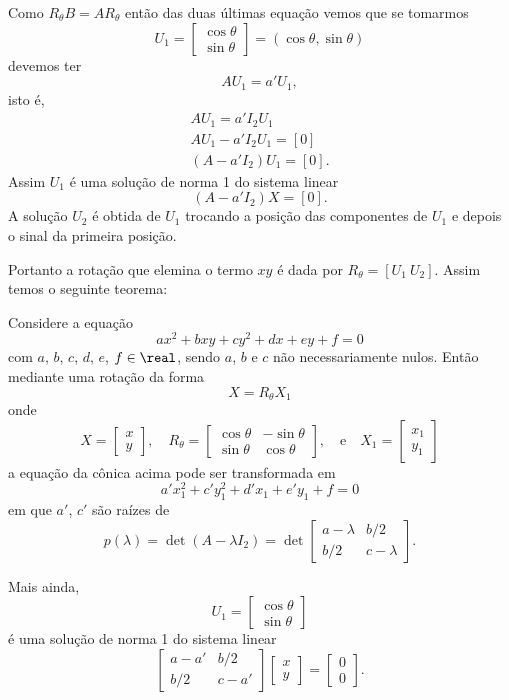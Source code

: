 Como $R_\theta B = AR_\theta$ então das duas \'ultimas equação vemos que se tomarmos
\[
  U_1 = \begin{bmatrix}
    \cos\theta\\
    \sin\theta
  \end{bmatrix} = (\cos\theta, \sin\theta)
\]
devemos ter
\[
  AU_1 = a'U_1,
\]
isto é,
\begin{align*}
  AU_1 = a'I_2 U_1\\
  AU_1 - a'I_2 U_1 = [0]\\
  (A - a'I_2)U_1 = [0].
\end{align*}
Assim $U_1$ é uma solução de norma 1 do sistema linear
\[
  (A - a'I_2)X = [0].
\]
A solução $U_2$ é obtida de $U_1$ trocando a posição das componentes de $U_1$ e depois o sinal da primeira posição.

Portanto a rotação que elemina o termo $xy$ é dada por $R_\theta = [U_1\ U_2]$. Assim temos o seguinte teorema:

\begin{teorema}
  Considere a equação
  \[
      ax^2 + bxy + cy^2 + dx + ey + f = 0
  \]
  com $a$, $b$, $c$, $d$, $e$, $f \in \real$, sendo $a$, $b$ e $c$ não necessariamente nulos. Então mediante uma rotação da forma
  \[
    X = R_\theta X_1
  \]
  onde
  \[
    X = \begin{bmatrix}
      x\\y
    \end{bmatrix}, \quad
    R_\theta = \begin{bmatrix}
    \cos\theta & -\sin\theta\\
    \sin\theta & \cos\theta
  \end{bmatrix}, \quad\mbox{e}\quad
  X_1 = \begin{bmatrix}
    x_1\\y_1
  \end{bmatrix}
  \]
  a equação da c\^onica acima pode ser transformada em
  \[
    a'x_1^2 + c'y_1^2 + d'x_1 + e'y_1 + f = 0
  \]
  em que $a'$, $c'$ são raízes de
  \[
    p(\lambda) = \det(A - \lambda I_2) = \det \begin{bmatrix}
      a - \lambda & b/2\\
      b/2 & c - \lambda
    \end{bmatrix}.
  \]

  Mais ainda,
  \[
    U_1 = \begin{bmatrix}
      \cos\theta\\ \sin\theta
    \end{bmatrix}
  \]
  é uma solução de norma 1 do sistema linear
  \[
    \begin{bmatrix}
      a - a' & b/2\\
      b/2 & c - a'
    \end{bmatrix} \begin{bmatrix}
      x\\y
    \end{bmatrix} = \begin{bmatrix}
      0\\0
    \end{bmatrix}.
  \]
\end{teorema}


